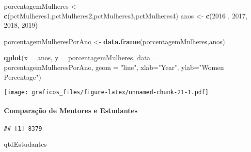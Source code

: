 \documentclass[
]{article}
\newenvironment{Shaded}{\begin{snugshade}}{\end{snugshade}}
\newcommand{\DataTypeTok}[1]{\textcolor[rgb]{0.13,0.29,0.53}{#1}}
\newcommand{\DecValTok}[1]{\textcolor[rgb]{0.00,0.00,0.81}{#1}}
\newcommand{\KeywordTok}[1]{\textcolor[rgb]{0.13,0.29,0.53}{\textbf{#1}}}
\newcommand{\NormalTok}[1]{#1}
\newcommand{\OperatorTok}[1]{\textcolor[rgb]{0.81,0.36,0.00}{\textbf{#1}}}
\newcommand{\StringTok}[1]{\textcolor[rgb]{0.31,0.60,0.02}{#1}}
\begin{document}
\begin{Shaded}
\begin{Highlighting}[]
\NormalTok{porcentagemMulheres <-}\StringTok{ }\KeywordTok{c}\NormalTok{(pctMulheres1,pctMulheres2,pctMulheres3,pctMulheres4)}
\NormalTok{anos <-}\StringTok{ }\KeywordTok{c}\NormalTok{(}\DecValTok{2016}\NormalTok{ , }\DecValTok{2017}\NormalTok{, }\DecValTok{2018}\NormalTok{, }\DecValTok{2019}\NormalTok{)}

\NormalTok{porcentagemMulheresPorAno <-}\StringTok{ }\KeywordTok{data.frame}\NormalTok{(porcentagemMulheres,anos)}

\KeywordTok{qplot}\NormalTok{(}\DataTypeTok{x =}\NormalTok{ anos, }\DataTypeTok{y =}\NormalTok{ porcentagemMulheres, }\DataTypeTok{data =}\NormalTok{ porcentagemMulheresPorAno, }\DataTypeTok{geom =} \StringTok{"line"}\NormalTok{, }\DataTypeTok{xlab=}\StringTok{"Year"}\NormalTok{, }\DataTypeTok{ylab=}\StringTok{"Women Percentage"}\NormalTok{)}
\end{Highlighting}
\end{Shaded}

\texttt{[image: graficos\_files/figure-latex/unnamed-chunk-21-1.pdf]}

\hypertarget{comparauxe7uxe3o-de-mentores-e-estudantes}{%
\paragraph{Comparação de Mentores e
Estudantes}\label{comparauxe7uxe3o-de-mentores-e-estudantes}}

\begin{Shaded}
\end{Shaded}

\begin{verbatim}
## [1] 8379
\end{verbatim}

\begin{Shaded}
\begin{Highlighting}[]
\NormalTok{qtdEstudantes}
\end{Highlighting}
\end{Shaded}
\end{document}
